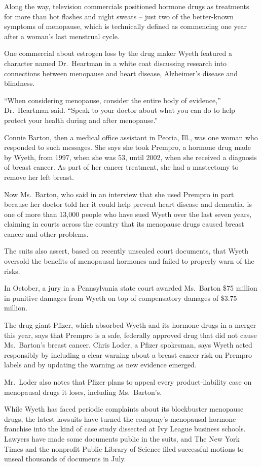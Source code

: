 ﻿\documentclass[12pt]{article}
\begin{document}
Along the way, television commercials positioned hormone drugs as treatments for more than hot
flashes and night sweats -- just two of the better-known symptoms of menopause, which is technically
defined as commencing one year after a woman's last menstrual cycle.

One commercial about estrogen loss by the drug maker Wyeth featured a character named Dr.~Heartman
in a white coat discussing research into connections between menopause and heart disease,
Alzheimer's disease and blindness.

``When considering menopause, consider the entire body of evidence,'' Dr.~Heartman said. ``Speak to
your doctor about what you can do to help protect your health during and after menopause.''

Connie Barton, then a medical office assistant in Peoria, Ill., was one woman who responded to such
messages. She says she took Prempro, a hormone drug made by Wyeth, from 1997, when she was 53, until
2002, when she received a diagnosis of breast cancer. As part of her cancer treatment, she had a
mastectomy to remove her left breast.

Now Ms.~Barton, who said in an interview that she used Prempro in part because her doctor told her
it could help prevent heart disease and dementia, is one of more than 13,000 people who have sued
Wyeth over the last seven years, claiming in courts across the country that its menopause drugs
caused breast cancer and other problems.

The suits also assert, based on recently unsealed court documents, that Wyeth oversold the benefits
of menopausal hormones and failed to properly warn of the risks.

In October, a jury in a Pennsylvania state court awarded Ms.~Barton \$75 million in punitive damages
from Wyeth on top of compensatory damages of \$3.75 million.

The drug giant Pfizer, which absorbed Wyeth and its hormone drugs in a merger this year, says that
Prempro is a safe, federally approved drug that did not cause Ms.~Barton's breast cancer. Chris
Loder, a Pfizer spokesman, says Wyeth acted responsibly by including a clear warning about a breast
cancer risk on Prempro labels and by updating the warning as new evidence emerged.

Mr.~Loder also notes that Pfizer plans to appeal every product-liability case on menopausal drugs it
loses, including Ms.~Barton's.

While Wyeth has faced periodic complaints about its blockbuster menopause drugs, the latest lawsuits
have turned the company's menopausal hormone franchise into the kind of case study dissected at Ivy
League business schools. Lawyers have made some documents public in the suits, and The New York
Times and the nonprofit Public Library of Science filed successful motions to unseal thousands of
documents in July.
\end{document}
